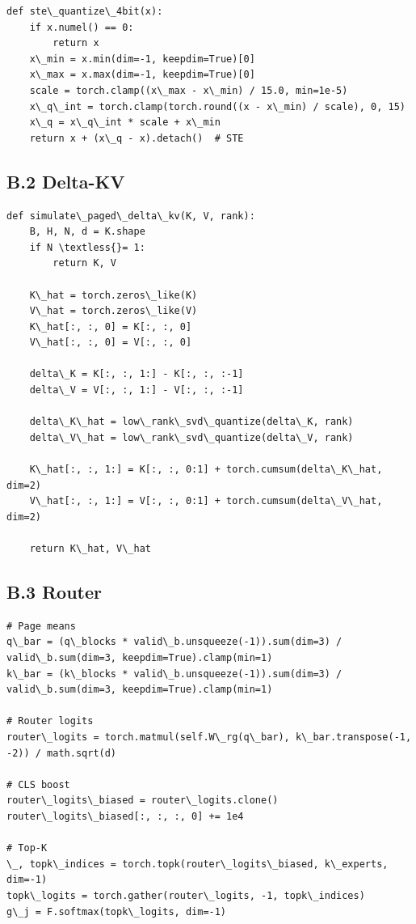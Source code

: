 \begin{lstlisting}
def ste\_quantize\_4bit(x):
    if x.numel() == 0:
        return x
    x\_min = x.min(dim=-1, keepdim=True)[0]
    x\_max = x.max(dim=-1, keepdim=True)[0]
    scale = torch.clamp((x\_max - x\_min) / 15.0, min=1e-5)
    x\_q\_int = torch.clamp(torch.round((x - x\_min) / scale), 0, 15)
    x\_q = x\_q\_int * scale + x\_min
    return x + (x\_q - x).detach()  # STE
\end{lstlisting}

\subsection{B.2 Delta-KV}

\begin{lstlisting}
def simulate\_paged\_delta\_kv(K, V, rank):
    B, H, N, d = K.shape
    if N \textless{}= 1:
        return K, V
    
    K\_hat = torch.zeros\_like(K)
    V\_hat = torch.zeros\_like(V)
    K\_hat[:, :, 0] = K[:, :, 0]
    V\_hat[:, :, 0] = V[:, :, 0]
    
    delta\_K = K[:, :, 1:] - K[:, :, :-1]
    delta\_V = V[:, :, 1:] - V[:, :, :-1]
    
    delta\_K\_hat = low\_rank\_svd\_quantize(delta\_K, rank)
    delta\_V\_hat = low\_rank\_svd\_quantize(delta\_V, rank)
    
    K\_hat[:, :, 1:] = K[:, :, 0:1] + torch.cumsum(delta\_K\_hat, dim=2)
    V\_hat[:, :, 1:] = V[:, :, 0:1] + torch.cumsum(delta\_V\_hat, dim=2)
    
    return K\_hat, V\_hat
\end{lstlisting}

\subsection{B.3 Router}

\begin{lstlisting}
# Page means
q\_bar = (q\_blocks * valid\_b.unsqueeze(-1)).sum(dim=3) / valid\_b.sum(dim=3, keepdim=True).clamp(min=1)
k\_bar = (k\_blocks * valid\_b.unsqueeze(-1)).sum(dim=3) / valid\_b.sum(dim=3, keepdim=True).clamp(min=1)

# Router logits
router\_logits = torch.matmul(self.W\_rg(q\_bar), k\_bar.transpose(-1, -2)) / math.sqrt(d)

# CLS boost
router\_logits\_biased = router\_logits.clone()
router\_logits\_biased[:, :, :, 0] += 1e4

# Top-K
\_, topk\_indices = torch.topk(router\_logits\_biased, k\_experts, dim=-1)
topk\_logits = torch.gather(router\_logits, -1, topk\_indices)
g\_j = F.softmax(topk\_logits, dim=-1)
\end{lstlisting}

